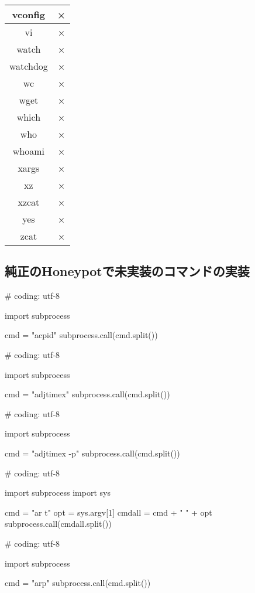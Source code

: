 \begin{longtable}{cc}
vconfig & × \\ \hline
vi & × \\ \hline
watch & × \\ \hline
watchdog & × \\ \hline
wc & × \\ \hline
wget & × \\ \hline
which & × \\ \hline
who & × \\ \hline
whoami & × \\ \hline
xargs & × \\ \hline
xz & × \\ \hline
xzcat & × \\ \hline
yes & × \\ \hline
zcat & × \\ \hline
\end{longtable}

\subsection{純正のHoneypotで未実装のコマンドの実装}
\label{appd:implofcommand}

\begin{mylisting}[label={lst:acpid},language=sh,caption=acpid]
# coding: utf-8

import subprocess

cmd = "acpid"
subprocess.call(cmd.split())
\end{mylisting}

\begin{mylisting}[label={lst:acpid},language=sh,caption=adjtimex]
# coding: utf-8

import subprocess

cmd = "adjtimex"
subprocess.call(cmd.split())

\end{mylisting}


\begin{mylisting}[label={lst:acpid},language=sh,caption=adjtimex -p]
# coding: utf-8

import subprocess

cmd = "adjtimex -p"
subprocess.call(cmd.split())

\end{mylisting}


\begin{mylisting}[label={lst:acpid},language=sh,caption=ar]
# coding: utf-8

import subprocess
import sys

cmd = "ar t"
opt = sys.argv[1]
cmdall = cmd + " " + opt
subprocess.call(cmdall.split())

\end{mylisting}
\begin{mylisting}[label={lst:acpid},language=sh,caption=arp]
# coding: utf-8

import subprocess

cmd = "arp"
subprocess.call(cmd.split())

\end{mylisting}

